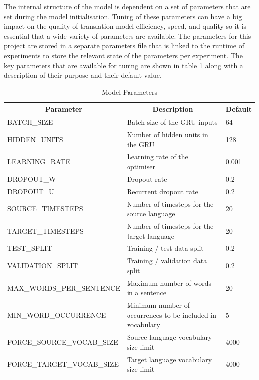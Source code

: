 The internal structure of the model is dependent on a set of parameters that are set during the model initialisation. 
Tuning of these parameters can have a big impact on the quality of translation model efficiency, speed, and quality so it is essential that a wide variety of parameters are available. The parameters for this project are stored in a separate parameters file that is linked to the runtime of experiments to store the relevant state of the parameters per experiment. The key parameters that are available for tuning are shown in table \ref{tab:model-parameters} along with a description of their purpose and their default value.



\begin{table}[!ht]
\centering
\small
\begin{tabular}{|l|p{6.6cm}|l|}
\hline
\multicolumn{1}{|c|}{\textbf{Parameter}} & \multicolumn{1}{c|}{\textbf{Description}}                                       & \textbf{Default} \\ \hline
BATCH\_SIZE                & Batch size of the \acrshort{GRU} inputs            & 64    \\ \hline
HIDDEN\_UNITS              & Number of hidden units in the \acrshort{GRU}       & 128   \\ \hline
LEARNING\_RATE             & Learning rate of the optimiser                     & 0.001 \\ \hline
DROPOUT\_W                 & Dropout rate                                       & 0.2   \\ \hline
DROPOUT\_U                 & Recurrent dropout rate                             & 0.2   \\ \hline
SOURCE\_TIMESTEPS          & Number of timesteps for the source language        & 20    \\ \hline
TARGET\_TIMESTEPS          & Number of timesteps for the target language        & 20    \\ \hline
TEST\_SPLIT                & Training / test data split                         & 0.2   \\ \hline
VALIDATION\_SPLIT          & Training / validation data split                   & 0.2   \\ \hline
MAX\_WORDS\_PER\_SENTENCE  & Maximum number of words in a sentence              & 20    \\ \hline
MIN\_WORD\_OCCURRENCE      & Minimum number of occurrences to be included in vocabulary & 5 \\ \hline
FORCE\_SOURCE\_VOCAB\_SIZE & Source language vocabulary size limit              & 4000 \\ \hline
FORCE\_TARGET\_VOCAB\_SIZE & Target language vocabulary size limit              & 4000 \\ \hline
\end{tabular}
\captionsetup{justification=centering,font=Large}
\caption{Model Parameters}
\label{tab:model-parameters}
\end{table}


